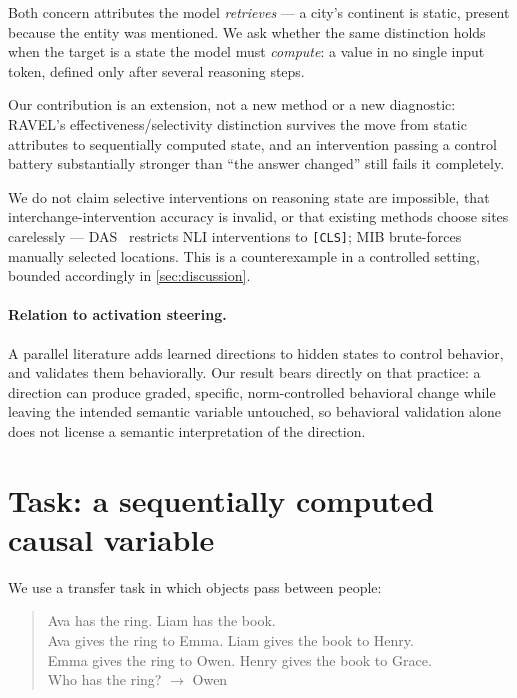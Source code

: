 \documentclass[11pt]{article}
\begin{document}
Both concern attributes the model \emph{retrieves} --- a city's continent is
static, present because the entity was mentioned. We ask whether the same
distinction holds when the target is a state the model must \emph{compute}: a
value in no single input token, defined only after several reasoning steps.

Our contribution is an extension, not a new method or a new diagnostic:
RAVEL's effectiveness/selectivity distinction survives the move from static
attributes to sequentially computed state, and an intervention passing a
control battery substantially stronger than \enquote{the answer changed} still
fails it completely.

We do not claim selective interventions on reasoning state are impossible,
that interchange-intervention accuracy is invalid, or that existing methods
choose sites carelessly --- DAS~\citep{geiger2024das} restricts NLI
interventions to \texttt{[CLS]}; MIB brute-forces manually selected locations.
This is a counterexample in a controlled setting, bounded accordingly in
\cref{sec:discussion}.

\paragraph{Relation to activation steering.}
A parallel literature adds learned directions to hidden states to control
behavior, and validates them behaviorally. Our result bears directly on that
practice: a direction can produce graded, specific, norm-controlled behavioral
change while leaving the intended semantic variable untouched, so behavioral
validation alone does not license a semantic interpretation of the direction.

\section{Task: a sequentially computed causal variable}
\label{sec:task}

We use a transfer task in which objects pass between people:

\begin{quote}\small\ttfamily
Ava has the ring. Liam has the book.\\
Ava gives the ring to Emma. Liam gives the book to Henry.\\
Emma gives the ring to Owen. Henry gives the book to Grace.\\
Who has the ring? $\rightarrow$ Owen
\end{quote}
\end{document}

